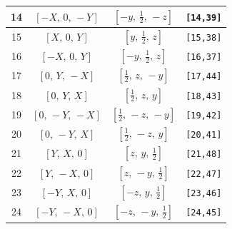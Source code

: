 \documentclass[fleqn,8pt]{jsarticle}
\begin{document}
\begin{longtable}{cccc}
14 & $\left[ - X,\, 0,\, - Y \right]$ & $\left[ - y,\, \frac{1}{2},\, - z \right]$ & {\tt [14,39]} \\ \hline
15 & $\left[ X,\, 0,\, Y \right]$ & $\left[ y,\, \frac{1}{2},\, z \right]$ & {\tt [15,38]} \\ \hline
16 & $\left[ - X,\, 0,\, Y \right]$ & $\left[ - y,\, \frac{1}{2},\, z \right]$ & {\tt [16,37]} \\ \hline
17 & $\left[ 0,\, Y,\, - X \right]$ & $\left[ \frac{1}{2},\, z,\, - y \right]$ & {\tt [17,44]} \\ \hline
18 & $\left[ 0,\, Y,\, X \right]$ & $\left[ \frac{1}{2},\, z,\, y \right]$ & {\tt [18,43]} \\ \hline
19 & $\left[ 0,\, - Y,\, - X \right]$ & $\left[ \frac{1}{2},\, - z,\, - y \right]$ & {\tt [19,42]} \\ \hline
20 & $\left[ 0,\, - Y,\, X \right]$ & $\left[ \frac{1}{2},\, - z,\, y \right]$ & {\tt [20,41]} \\ \hline
21 & $\left[ Y,\, X,\, 0 \right]$ & $\left[ z,\, y,\, \frac{1}{2} \right]$ & {\tt [21,48]} \\ \hline
22 & $\left[ Y,\, - X,\, 0 \right]$ & $\left[ z,\, - y,\, \frac{1}{2} \right]$ & {\tt [22,47]} \\ \hline
23 & $\left[ - Y,\, X,\, 0 \right]$ & $\left[ - z,\, y,\, \frac{1}{2} \right]$ & {\tt [23,46]} \\ \hline
24 & $\left[ - Y,\, - X,\, 0 \right]$ & $\left[ - z,\, - y,\, \frac{1}{2} \right]$ & {\tt [24,45]} \\
\end{longtable}
\renewcommand{\arraystretch}{1.2}
\end{document}
